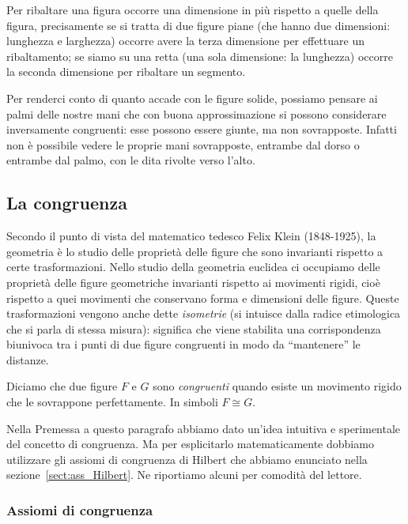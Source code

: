 \osservazione Per ribaltare una figura occorre una dimensione in più 
rispetto a quelle della figura, precisamente se si tratta di due 
figure piane (che hanno due dimensioni: lunghezza e larghezza)  
occorre avere la terza dimensione per effettuare un ribaltamento; se 
siamo su una retta (una sola dimensione: la lunghezza) occorre la 
seconda dimensione per ribaltare un segmento.

Per renderci conto di quanto accade con le figure solide, possiamo 
pensare ai palmi delle nostre mani che con buona approssimazione si 
possono considerare inversamente congruenti: esse possono essere 
giunte, ma non sovrapposte. Infatti non è possibile vedere le proprie 
mani sovrapposte, entrambe dal dorso o entrambe dal palmo, con le 
dita rivolte verso l'alto.

\subsection{La congruenza}

Secondo il punto di vista del matematico tedesco Felix Klein 
(1848-1925), la geometria è lo studio delle proprietà delle figure 
che sono invarianti rispetto a certe trasformazioni. Nello studio 
della geometria euclidea ci occupiamo delle proprietà delle figure geometriche 
invarianti 
rispetto ai movimenti rigidi, cioè rispetto a quei movimenti che 
conservano forma e dimensioni delle figure. Queste trasformazioni 
vengono anche dette \emph{isometrie} (si intuisce dalla radice 
etimologica che si parla di stessa misura): significa che viene 
stabilita una corrispondenza biunivoca tra i punti di due figure 
congruenti in modo da ``mantenere'' le distanze.

\begin{definizione}
Diciamo che due figure $F$ e $G$ sono \emph{congruenti} quando esiste 
un movimento rigido che le sovrappone perfettamente. In simboli 
$F\cong G$.
\end{definizione}

Nella Premessa a questo paragrafo abbiamo dato un'idea intuitiva e 
sperimentale del concetto di congruenza. Ma per esplicitarlo 
matematicamente dobbiamo utilizzare gli assiomi di congruenza di 
Hilbert che abbiamo enunciato nella sezione~\ref{sect:ass_Hilbert}. 
Ne riportiamo alcuni per comodità del lettore.


\subsubsection{Assiomi di congruenza}

